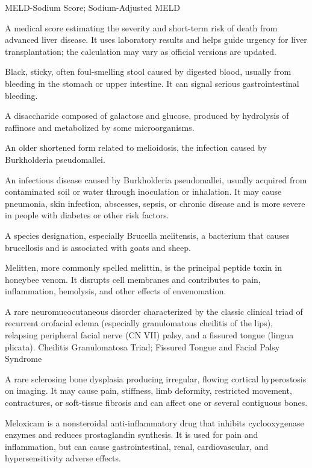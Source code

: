 \synonyms
MELD-Sodium Score; Sodium-Adjusted MELD

 A medical score estimating the severity and short-term risk of death from advanced liver disease. It uses laboratory results and helps guide urgency for liver transplantation; the calculation may vary as official versions are updated.

 Black, sticky, often foul-smelling stool caused by digested blood, usually from bleeding in the stomach or upper intestine. It can signal serious gastrointestinal bleeding.

 A disaccharide composed of galactose and glucose, produced by hydrolysis of raffinose and metabolized by some microorganisms.

 An older shortened form related to melioidosis, the infection caused by Burkholderia pseudomallei.

 An infectious disease caused by Burkholderia pseudomallei, usually acquired from
contaminated soil or water through inoculation or inhalation. It may cause pneumonia,
skin infection, abscesses, sepsis, or chronic disease and is more severe in people with
diabetes or other risk factors.

 A species designation, especially Brucella melitensis, a bacterium that causes brucellosis and is associated with goats and sheep.

 Melitten, more commonly spelled melittin, is the principal peptide toxin in honeybee venom. It disrupts cell membranes and contributes to pain, inflammation, hemolysis, and other effects of envenomation.

 A rare neuromucocutaneous disorder characterized by the classic clinical triad of recurrent orofacial edema (especially granulomatous cheilitis of the lips), relapsing peripheral facial nerve (CN VII) palsy, and a fissured tongue (lingua plicata).
\synonyms
Cheilitis Granulomatosa Triad; Fissured Tongue and Facial Palsy Syndrome

 A rare sclerosing bone dysplasia producing irregular, flowing cortical hyperostosis on
imaging. It may cause pain, stiffness, limb deformity, restricted movement,
contractures, or soft-tissue fibrosis and can affect one or several contiguous bones.

 Meloxicam is a nonsteroidal anti-inflammatory drug that inhibits cyclooxygenase enzymes and reduces prostaglandin synthesis. It is used for pain and inflammation, but can cause gastrointestinal, renal, cardiovascular, and hypersensitivity adverse effects.

